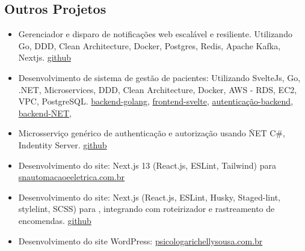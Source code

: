 \documentclass[11pt,a4paper,sans]{moderncv}
\begin{document}
\begin{samepage}
	\section{Outros Projetos}
	\begin{itemize}[itemsep=0cm, leftmargin=0.6cm, label={\textbullet}]
		\item Gerenciador e disparo de notificações web escalável e resiliente. Utilizando Go, DDD, Clean Architecture, Docker, Postgres, Redis, Apache Kafka, Nextjs. {\color{blue}\href{https://github.com/beriloqueiroz/desafio-dev}{github}}
		\item Desenvolvimento de sistema de gestão de pacientes: Utilizando SvelteJs, Go, .NET, Microservices, DDD, Clean Architecture, Docker, AWS - RDS, EC2, VPC, PostgreSQL.
			      {\color{blue}\href{https://github.com/beriloqueiroz/prontu-go}{backend-golang}}, {\color{blue}\href{https://github.com/beriloqueiroz/prontu-front}{frontend-svelte}}, {\color{blue}\href{https://github.com/beriloqueiroz/auth-prontu}{autenticação-backend}}, {\color{blue}\href{https://github.com/beriloqueiroz/prontu}{backend-\.NET}},
		\item Microsserviço genérico de authenticação e autorização usando \.NET C\#, Indentity Server. {\color{blue}\href{https://github.com/beriloqueiroz/auth-user}{github}}
		\item Desenvolvimento do site: Next.js 13 (React.js, ESLint, Tailwind) para {\color{blue}\href{https://snautomacaoeeletrica.com.br}{snautomacaoeeletrica.com.br}}
		\item Desenvolvimento do site: Next.js (React.js, ESLint, Husky, Staged-lint, stylelint, SCSS) para , integrando com roteirizador e rastreamento de encomendas. {\color{blue}\href{https://github.com/beriloqueiroz/bid-site}{github}}
		\item Desenvolvimento do site WordPress: {\color{blue}\href{psicologarichellysousa.com.br}{psicologarichellysousa.com.br}}
	\end{itemize}
\end{samepage}
\vspace{\baselineskip}
\end{document}
